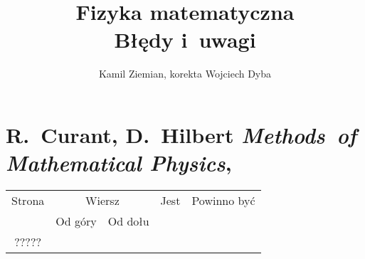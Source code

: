 \documentclass[a4paper,11pt]{article}
\title{Fizyka matematyczna \\
  {\Large Błędy i~uwagi}}
\author{Kamil Ziemian, korekta Wojciech Dyba}
\numberwithin{equation}{section}
\begin{document}





\maketitle %





\section{R.~Curant, D.~Hilbert \textit{Methods~of
    Mathematical Physics}, \cite{}}





\begin{center}

  \begin{tabular}{|c|c|c|c|c|}
    \hline
    Strona & \multicolumn{2}{c|}{Wiersz} & Jest
                              & Powinno być \\ \cline{2-3}
    & Od góry & Od dołu & & \\
    \hline
    ????? & & & & \\
    \hline
  \end{tabular}

\end{center}

\VerSpaceTwo


\end{document}
